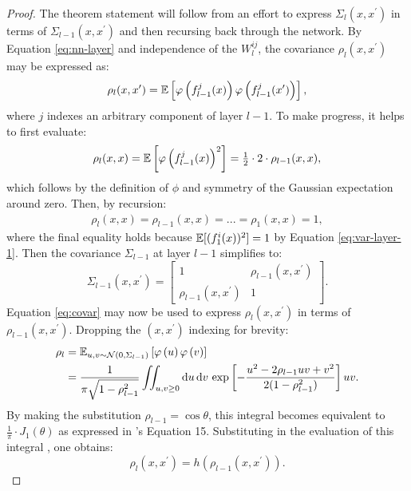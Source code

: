 \begin{refsection}
\begin{proof}
    The theorem statement will follow from an effort to express $\Sigma_l(x,x^\prime)$ in terms of $\Sigma_{l-1}(x,x^\prime)$ and then recursing back through the network. By Equation \ref{eq:nn-layer} and independence of the $W_l^{ij}$, the covariance $\rho_l(x,x^\prime)$ may be expressed as: 
    \begin{equation}\label{eq:covar}
        \rho_{l}(x,x^\prime) = \operatorname{\mathbb{E}} \left[ \varphi \left(f_{l-1}^j(x)\right) \varphi \left(f_{l-1}^j(x^\prime)\right) \right],
    \end{equation}
    where $j$ indexes an arbitrary component of layer $l-1$. To make progress, it helps to first evaluate:
    \begin{gather*}
        \rho_l(x,x) = \operatorname{\mathbb{E}} \left[ \varphi \left(f_{l-1}^j(x)\right)^2 \right] = \tfrac{1}{2} \cdot 2 \cdot \rho_{l-1}(x,x),
    \end{gather*}
    which follows by the definition of $\phi$ and symmetry of the Gaussian expectation around zero. Then, by recursion:
    \begin{gather*}
        \rho_{l}(x,x) = \rho_{l-1}(x,x) =... = \rho_{1}(x,x) = 1,
    \end{gather*}
    where the final equality holds because $\operatorname{\mathbb{E}}[(f_1^i(x))^2] = 1$ by Equation \ref{eq:var-layer-1}. Then the covariance $\Sigma_{l-1}$ at layer $l-1$ simplifies to:
    \begin{equation*}
        \Sigma_{l-1}(x,x^\prime)=
          \begin{bmatrix}
            1 & \rho_{l-1}(x,x^\prime)  \\
            \rho_{l-1}(x,x^\prime) & 1
          \end{bmatrix}.
    \end{equation*}
    Equation \ref{eq:covar} may now be used to express $\rho_l(x,x^\prime)$ in terms of $\rho_{l-1}(x,x^\prime)$. Dropping the $(x,x^\prime)$ indexing for brevity:
    \begin{align*}
        \rho_l &= \operatorname{\mathbb{E}}_{u,v\sim \mathcal{N}\left(0,\Sigma_{l-1}\right)} \left[ \varphi \left(u\right) \varphi \left(v\right) \right] \\
        &= \frac{1}{\pi \sqrt{1-\rho_{l-1}^2}} \iint_{u,v\geq0}\mathrm{d}{u}\,\mathrm{d}{v}\, \exp\left[-\frac{u^2 - 2 \rho_{l-1} uv + v^2}{2(1-\rho_{l-1}^2)}\right]uv.
    \end{align*}
    By making the substitution $\rho_{l-1}=\cos\theta$, this integral becomes equivalent to $\frac{1}{\pi}\cdot J_1(\theta)$ as expressed in \citet{choandsaul}'s Equation 15. Substituting in the evaluation of this integral \citep[Equation 6]{choandsaul}, one obtains:
    \begin{equation}\label{eq:recur}
      \rho_{l}(x,x^\prime) = h(\rho_{l-1}(x,x^\prime)).
    \end{equation}
    

\end{proof}
\end{refsection}
